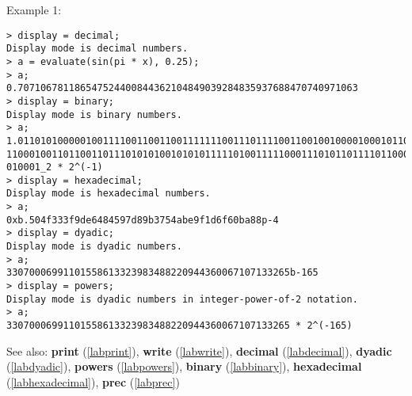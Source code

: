 \noindent Example 1: 
\begin{center}\begin{minipage}{15cm}\begin{Verbatim}[frame=single]
> display = decimal;
Display mode is decimal numbers.
> a = evaluate(sin(pi * x), 0.25);
> a;
0.707106781186547524400844362104849039284835937688470740971063
> display = binary;
Display mode is binary numbers.
> a;
1.011010100000100111100110011001111111001110111100110010010000100010110010111110
11000100110110011011101010100101010111110100111110001110101101111011000001011101
010001_2 * 2^(-1)
> display = hexadecimal;
Display mode is hexadecimal numbers.
> a;
0xb.504f333f9de6484597d89b3754abe9f1d6f60ba88p-4
> display = dyadic;
Display mode is dyadic numbers.
> a;
33070006991101558613323983488220944360067107133265b-165
> display = powers;
Display mode is dyadic numbers in integer-power-of-2 notation.
> a;
33070006991101558613323983488220944360067107133265 * 2^(-165)
\end{Verbatim}
\end{minipage}\end{center}
See also: \textbf{print} (\ref{labprint}), \textbf{write} (\ref{labwrite}), \textbf{decimal} (\ref{labdecimal}), \textbf{dyadic} (\ref{labdyadic}), \textbf{powers} (\ref{labpowers}), \textbf{binary} (\ref{labbinary}), \textbf{hexadecimal} (\ref{labhexadecimal}), \textbf{prec} (\ref{labprec})
